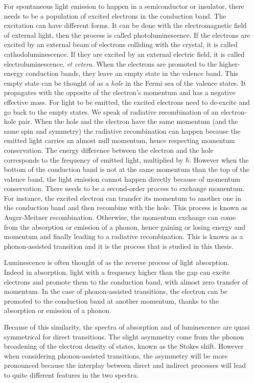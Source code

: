 For spontaneous light emission to happen in a semiconductor or insulator, there needs to be a population of excited electrons in the conduction band. The excitation can have different forms. It can be done with the electromagnetic field of external light, then the process is called photoluminescence. If the electrons are excited by an external beam of electrons colliding with the crystal, it is called cathodoluminescence. If they are excited by an external electric field, it is called electroluminescence, \textit{et cetera}. When the electrons are promoted to the higher-energy conduction bands, they leave an empty state in the valence band. This empty state can be thought of as a \textit{hole} in the Fermi sea of the valence states. It propagates with the opposite of the electron's momentum and has a negative effective mass. For light to be emitted, the excited electrons need to de-excite and go back to the empty states. We speak of radiative recombination of an electron-hole pair. When the hole and the electron have the same momentum (and the same spin and symmetry) the radiative recombination can happen because the emitted light carries an almost null momentum, hence respecting momentum conservation. The energy difference between the electron and the hole corresponds to the frequency of emitted light, multiplied by $\hbar$. 
However when the bottom of the conduction band is not at the same momentum than the top of the valence band, the light emission cannot happen directly because of momentum conservation. There needs to be a second-order process to exchange momentum. For instance, the excited electron can transfer its momentum to another one in the conduction band and then recombine with the hole. This process is known as Auger-Meitner recombination.\cite{delaney2009auger} Otherwise, the momentum exchange can come from the absorption or emission of a phonon, hence gaining or losing energy and momentum and finally leading to a radiative recombination. This is known as a phonon-assisted transition and it is the process that is studied in this thesis. 

Luminescence is often thought of as the reverse process of light absorption. Indeed in absorption, light with a frequency higher than the gap can excite electrons and promote them to the conduction band, with almost zero transfer of momentum. In the case of phonon-assisted transitions, the electron can be promoted to the conduction band at another momentum, thanks to the absorption or emission of a phonon. 

Because of this similarity, the spectra of absorption and of luminescence are quasi symmetrical for direct transitions. The slight asymmetry come from the phonon broadening of the electron density of states, known as the Stokes shift. However when considering phonon-assisted transitions, the asymmetry will be more pronounced because the interplay between direct and indirect processes will lead to quite different features in the two spectra.

